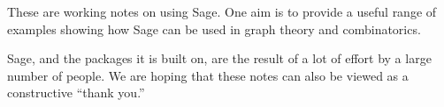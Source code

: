 \begin{preface}
%
\begin{para}
These are working notes on using Sage. One aim is to provide a useful range of examples showing how Sage can be used in graph theory and combinatorics.
\end{para}
%
\begin{para}
Sage, and the packages it is built on, are the result of a lot of effort by a large number of people. We are hoping that these notes can also be viewed as a constructive ``thank you.''
\end{para}
%
\end{preface}
